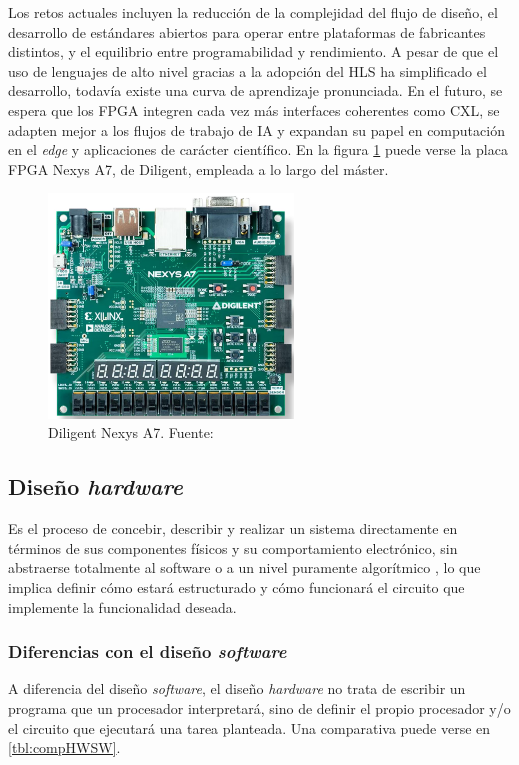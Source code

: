 Los retos actuales incluyen la reducción de la complejidad del flujo de diseño, el desarrollo de estándares abiertos para operar entre plataformas de fabricantes distintos, y el equilibrio entre programabilidad y rendimiento. A pesar de que el uso de lenguajes de alto nivel gracias a la adopción del \ac{HLS} ha simplificado el desarrollo, todavía existe una curva de aprendizaje pronunciada. En el futuro, se espera que los FPGA integren cada vez más interfaces coherentes como CXL, se adapten mejor a los flujos de trabajo de IA y expandan su papel en computación en el \textit{edge} y aplicaciones de carácter científico. En la figura \ref{fig:fpgaNexys} puede verse la placa FPGA Nexys A7, de Diligent, empleada a lo largo del máster.

\begin{figure}[!ht]
  \centering
  \includegraphics[width=6.5cm]{figures/nexysFoto.png}
  \caption{Diligent Nexys A7. Fuente: \cite{nexysFoto}}
  \label{fig:fpgaNexys}
\end{figure}

\subsection{Diseño \textit{hardware}}

Es el proceso de concebir, describir y realizar un sistema directamente en términos de sus componentes físicos y su comportamiento electrónico, sin abstraerse totalmente al software o a un nivel puramente algorítmico \cite{disenoHW}, lo que implica definir cómo estará estructurado y cómo funcionará el circuito que implemente la funcionalidad deseada.

\subsubsection{Diferencias con el diseño \textit{software}}

A diferencia del diseño \textit{software}, el diseño \textit{hardware} no trata de escribir un programa que un procesador interpretará, sino de definir el propio procesador y/o el circuito que ejecutará una tarea planteada. Una comparativa puede verse en \ref{tbl:compHWSW}.

